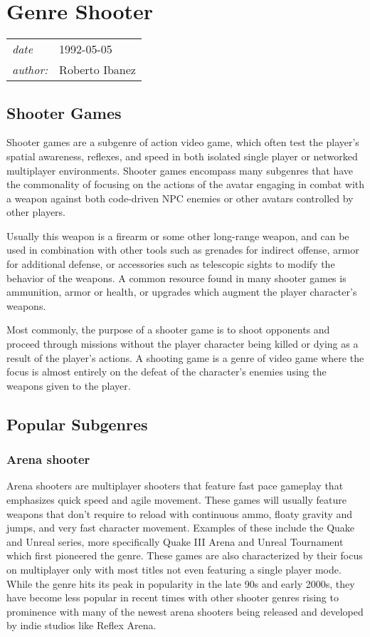 \documentclass[a4paper,10pt]{book}
\newcommand{\pageHeader}[4]{
    \section{#1}
    \vspace{-0.3cm}
    \begin{table}[h!]
     \begin{tabular}{ll}
        \hline
        \textit{date} & #2 \\
        \textit{author: } & #3\\
        \hline
     \end{tabular}
    \end{table}
    \vspace{-0.3cm}
}
\begin{document}
 
 \newpage\pageHeader{Genre Shooter}{1992-05-05}{Roberto Ibanez}{Shooter game, video game genre}
 \subsection{Shooter Games  }
 
            Shooter games are a subgenre of action video game, which often test the player's spatial awareness, reflexes, and speed in both isolated single player or networked multiplayer environments. 
            Shooter games encompass many subgenres that have the commonality of focusing on the actions of the avatar engaging in combat with a weapon against both code-driven NPC enemies or other avatars controlled by other players.
         
 
            Usually this weapon is a firearm or some other long-range weapon, and can be used in combination with other tools such as grenades for indirect offense, armor for additional defense, or accessories such as telescopic sights to modify the behavior of the weapons. 
            A common resource found in many shooter games is ammunition, armor or health, or upgrades which augment the player character's weapons.
         
 Most commonly, the purpose of a shooter game is to shoot opponents and proceed through missions without the player character being killed or dying as a result of the player's actions. 
            A shooting game is a genre of video game where the focus is almost entirely on the defeat of the character's enemies using the weapons given to the player.
         
 \subsection{Popular Subgenres }
 \subsubsection{Arena shooter }
 
            Arena shooters are multiplayer shooters that feature fast pace gameplay that emphasizes quick speed and agile movement. 
            These games will usually feature weapons that don't require to reload with continuous ammo, floaty gravity and jumps, and very fast character movement. 
            Examples of these include the Quake and Unreal series, more specifically Quake III Arena and Unreal Tournament which first pioneered the genre. 
            These games are also characterized by their focus on multiplayer only with most titles not even featuring a single player mode. 
            While the genre hits its peak in popularity in the late 90s and early 2000s, they have become less popular in recent times with other shooter genres rising to prominence with many of the newest arena shooters being released and developed by indie studios like Reflex Arena. 
         
\end{document}
